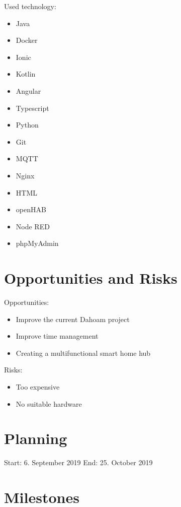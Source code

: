 \documentclass[12pt]{article}
\theoremstyle{definition}
\begin{document}
\pagebreak
Used technology:
\begin{itemize}
    \item Java
    \item Docker
    \item Ionic
    \item Kotlin
    \item Angular
    \item Typescript
    \item Python
    \item Git
    \item MQTT
    \item Nginx
    \item HTML
    \item openHAB
    \item Node RED
    \item phpMyAdmin
\end{itemize}
\newline


\pagebreak

\section{Opportunities and Risks}
Opportunities:
\begin{itemize}
    \item Improve the current Dahoam project
    \item Improve time management
    \item Creating a multifunctional smart home hub
\end{itemize}
\newline
Risks:
\begin{itemize}
    \item Too expensive
    \item No suitable hardware
\end{itemize}

\pagebreak
\section{Planning}
Start: 6. September 2019
\newline
End: 25. October 2019

\pagebreak
\section{Milestones}
\end{document}
